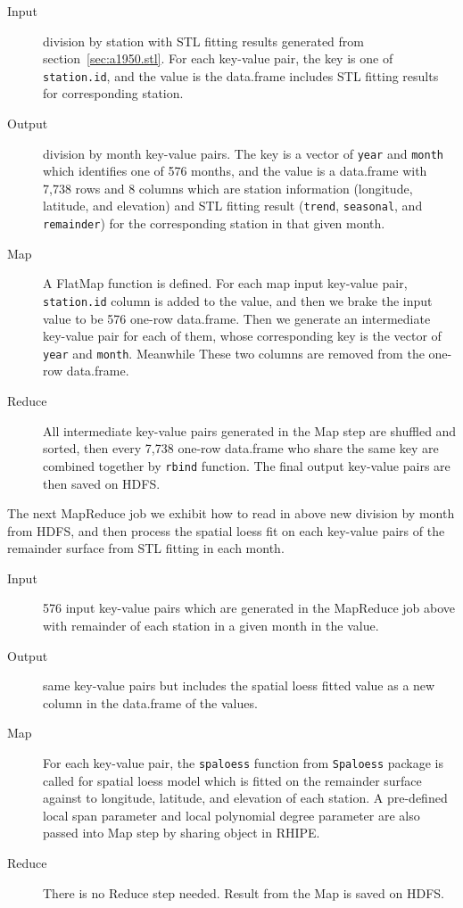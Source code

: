 \begin{description}
  \item[Input] division by station with STL fitting results generated from 
  section~\ref{sec:a1950.stl}. For each key-value pair, the key is one of 
  \texttt{station.id}, and the value is the data.frame includes STL fitting 
  results for corresponding station.
  \item[Output] division by month key-value pairs. The key is a vector of 
  \texttt{year} and \texttt{month} which identifies one of 576 months, and the 
  value is a data.frame with 7,738 rows and 8 columns which are station 
  information (longitude, latitude, and elevation) and STL fitting result 
  (\texttt{trend}, \texttt{seasonal}, and \texttt{remainder}) for the 
  corresponding station in that given month.
  \item[Map] A FlatMap function is defined. For each map input key-value pair, 
  \texttt{station.id} column is added to the value, and then we brake the input 
  value to be 576 one-row data.frame. Then we generate an intermediate key-value 
  pair for each of them, whose corresponding key is the vector of \texttt{year} 
  and \texttt{month}. Meanwhile These two columns are removed from the one-row 
  data.frame.   
  \item[Reduce] All intermediate key-value pairs generated in the Map step are 
  shuffled and sorted, then every 7,738 one-row data.frame who share the same 
  key are combined together by \texttt{rbind} function. The final output key-value
  pairs are then saved on HDFS.
\end{description}

The next MapReduce job we exhibit how to read in above new division by month from 
HDFS, and then process the spatial loess fit on each key-value pairs of the 
remainder surface from STL fitting in each month.

\begin{description}
  \item[Input] 576 input key-value pairs which are generated in the MapReduce job
  above with remainder of each station in a given month in the value.
  \item[Output] same key-value pairs but includes the spatial loess fitted value
  as a new column in the data.frame of the values.
  \item[Map] For each key-value pair, the \texttt{spaloess} function from 
  \texttt{Spaloess} package is called for spatial loess model which is fitted on
  the remainder surface against to longitude, latitude, and elevation of each 
  station. A pre-defined local span parameter and local polynomial degree 
  parameter are also passed into Map step by sharing object in RHIPE.  
  \item[Reduce] There is no Reduce step needed. Result from the Map is saved on
  HDFS.
\end{description}

